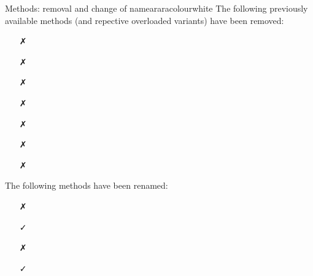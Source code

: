 \begin{messagebox}{Methods: removal and change of name}{araracolour}{\icinfo}{white}
The following previously available methods (and repective overloaded variants) have been removed:

\begin{itemize}
\item[\textcolor{warningcolour}{\faClose}] 
\item[\textcolor{warningcolour}{\faClose}] 
\item[\textcolor{warningcolour}{\faClose}] 
\item[\textcolor{warningcolour}{\faClose}] 
\item[\textcolor{warningcolour}{\faClose}] 
\item[\textcolor{warningcolour}{\faClose}] 
\item[\textcolor{warningcolour}{\faClose}] 
\end{itemize}

The following methods have been renamed:
\begin{itemize}
\item[\textcolor{warningcolour}{\faClose}] 

\vspace{.5em}

\hspace{2cm}\textcolor{teal}{\faArrowDown}

\item[\textcolor{okcolour}{\faCheck}]

\vspace{1em}

\item[\textcolor{warningcolour}{\faClose}] 

\vspace{.5em}

\hspace{2cm}\textcolor{teal}{\faArrowDown}

\item[\textcolor{okcolour}{\faCheck}] 


\end{itemize}
\end{messagebox}
